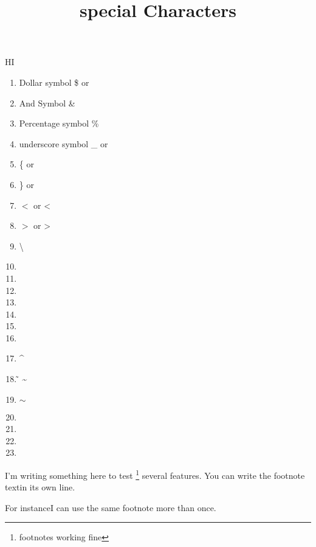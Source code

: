 \documentclass{article}
\title{special Characters}
\begin{document}
HI
\begin{enumerate}
	\item  Dollar symbol	\textendash  \$ or \textdollar
	\item   And Symbol	\textendash \&
	\item   Percentage symbol	\textendash\%
	\item   underscore symbol \textendash \_ or \textunderscore
	\item    \{ or \textbraceleft
	\item    \} or \textbraceright
	\item     $<$ or \textless
	\item 	$>$ or \textgreater
	\item 	\textbackslash
	\item   \textbar
	\item 	 \textbullet
	\item 	 \textdaggerdbl
	\item 	  \textdagger
	\item 		\textparagraph
	\item 		\textsection
	\item 		 \textcopyright
	\item \textasciicircum
	\item ̃ \textasciitilde
	\item  $\sim$
	\item  \textregistered
	\item  \texttrademark
	\item  \textordfeminine
	\item   \textordmasculine
\end{enumerate}


	I'm writing something here to test \footnote{footnotes working fine} 
several features. You can write the footnote text\footnotemark in its 
own line.
 
 
For instance\footnotemark I can use the same footnote more than 
once\footnotemark[\value{footnote}].
 
\end{document}
